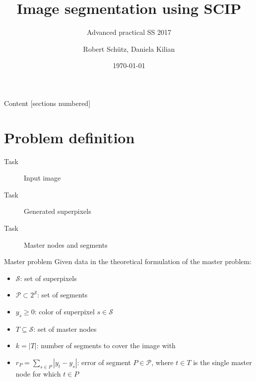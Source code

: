 \documentclass[fleqn]{beamer}
\title{Image segmentation using SCIP}
\date{\today}
\author{Robert Schütz, Daniela Kilian}
\subtitle{Advanced practical SS 2017}
\newcommand{\superpixels}{\mathcal{S}}
\newcommand{\segments}{\mathcal{P}}
\begin{document}
	\maketitle
	
	\begin{frame}{Content}
		[sections numbered]
		\tableofcontents
	\end{frame}

    \section{Problem definition}
	\begin{frame}{Task}
		\begin{figure}
            \begin{center}
                \def\svgwidth{60mm}
                
                \caption{Input image}
            \end{center}
		\end{figure}
	\end{frame}

    \begin{frame}{Task}
        \begin{figure}
            \begin{center}
               \def\svgwidth{60mm}
               
               \caption{Generated superpixels}
           \end{center}
        \end{figure}
    \end{frame}

    \begin{frame}{Task}
        \begin{figure}
            \begin{center}
                \def\svgwidth{60mm}
                
                \caption{Master nodes and segments}
            \end{center}
        \end{figure}
    \end{frame}

    \begin{frame}{Master problem}
        Given data in the theoretical formulation of the master problem:
        \begin{itemize}
            \item $\superpixels$: set of superpixels
            \item $\segments\subset2^\superpixels$: set of segments %
            \item $y_s\geq0$: color of superpixel $s\in\superpixels$
            \item $T\subseteq\superpixels$: set of master nodes %
            \item $k=|T|$: number of segments to cover the image with
            \item $r_P=\sum_{s\in P}|y_t-y_s|$: error of segment $P\in\segments$,
            where $t\in T$ is the single master node for which $t\in P$
        \end{itemize}
    \end{frame}
	
\end{document}
